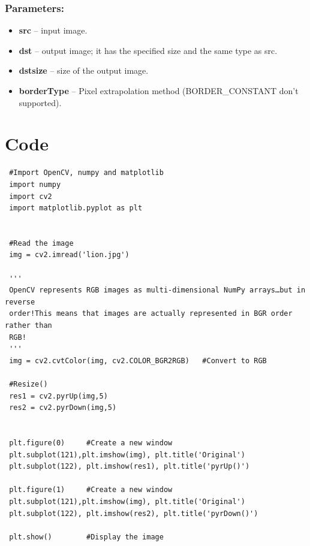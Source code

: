 \documentclass[]{article}
\providecommand{\tightlist}{%
  \setlength{\itemsep}{0pt}\setlength{\parskip}{0pt}}
\begin{document}
\subsubsection{Parameters:}\label{parameters-1}

\begin{itemize}
\tightlist
\item
  \textbf{src} -- input image.
\item
  \textbf{dst} -- output image; it has the specified size and the same
  type as src.
\item
  \textbf{dstsize} -- size of the output image.
\item
  \textbf{borderType} -- Pixel extrapolation method (BORDER\_CONSTANT
  don't supported).
\end{itemize}

\section{Code}\label{code-1}

\begin{verbatim}
 #Import OpenCV, numpy and matplotlib
 import numpy
 import cv2
 import matplotlib.pyplot as plt


 #Read the image
 img = cv2.imread('lion.jpg')

 '''
 OpenCV represents RGB images as multi-dimensional NumPy arrays…but in reverse
 order!This means that images are actually represented in BGR order rather than
 RGB!
 '''
 img = cv2.cvtColor(img, cv2.COLOR_BGR2RGB)   #Convert to RGB

 #Resize()
 res1 = cv2.pyrUp(img,5)
 res2 = cv2.pyrDown(img,5)


 plt.figure(0)     #Create a new window
 plt.subplot(121),plt.imshow(img), plt.title('Original')
 plt.subplot(122), plt.imshow(res1), plt.title('pyrUp()')

 plt.figure(1)     #Create a new window
 plt.subplot(121),plt.imshow(img), plt.title('Original')
 plt.subplot(122), plt.imshow(res2), plt.title('pyrDown()')

 plt.show()        #Display the image
\end{verbatim}
\end{document}
